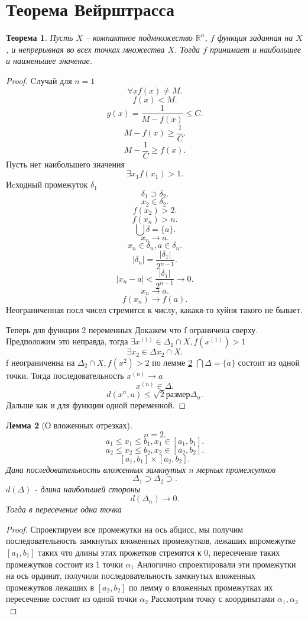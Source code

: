 \documentclass[14pt]{extarticle} \usepackage{fontspec}
\newtheorem{theorem}{Теорема}
\newtheorem{lemma}[theorem]{Лемма}
\begin{document}
\section{Теорема Вейрштрасса}
\begin{theorem}
    Пусть $X$ -- компактное подмножество $\mathbb{R}^{n}$, $f$ функция заданная на  $X$, и непрерывная во всех точках множества  $X$. Тогда $f$ принимает и наибольшее и наименьшее значение.
\end{theorem}
\begin{proof}
    Cлучай для $n  = 1$
    \[
    \forall  x f(x) \neq M
    .\] 
    \[
    f(x) < M
    .\] 
    \[
    g(x) = \frac{1}{M - f(x)} \le  C
    .\] 
    \[
    M - f(x) \ge  \frac{1}{C}
    .\] 
    \[
    M - \frac{1}{C} \ge  f(x)
    .\] 
    Пусть нет наибольшего значения
    \[
    \exists  x_1  f(x_1) > 1
    .\] 
    Иcходный промежуток  $\delta_1$
    \[
        \delta_1 \supset \delta_2
    .\]
    \[
    x_2 \in \delta_2
    .\] 
    \[
    f(x_2) > 2
    .\] 
    \[
    f(x_{n}) > n
    .\] 
    \[
        \bigcup  \delta = \{a\}
    .\]
    \[
    x_{n} \to a
    .\] 
    \[
    x_{n} \in \delta_{n}, a \in \delta_{n}
    .\] 
    \[
    |\delta_{n}| = \frac{|\delta_1|}{2^{n-1}}
    .\] 
    \[
    |x_{n} - a| < \frac{|\delta_{1}|}{2^{n - 1}} \to 0
    .\] 
    \[
    x_{n} \to a
    .\] 
    \[
    f(x_{n}) \to f(a)
    .\] 
    Неограниченная посл чисел стремится к числу, какакя-то хуйня такого не бывает.
    
    Теперь для функции $2$ переменных
    Докажем что  f ограничена сверху. Предположим это неправда, тогда $\exists x^{(1)} \in \Delta_{1} \cap X,  f(x^{(1)}) >  1$
    \[
   \exists x_2 \in  \Delta x_2 \cap X
    .\] 
    f неограниченна на $\Delta_2 \cap X, f(x^{2}) > 2$
    по лемме \ref{1} $\bigcap \Delta = \{a\}$ состоит из одной точки.
    Тогда последовательность $x^{(n)} \to a$
    \[
    x^{(n)} \in \Delta
    .\] 
    \[
        d(x^{n},a) \le \sqrt{2} \text{размер} \Delta_{n}
    .\] 
    Дальше как и для функции одной переменной.
\end{proof}
\begin{lemma}[О вложенных отрезках] \label{1}
    \[
    n  = 2
    .\] 
    \[
        a_1 \le  x_1 \le  b_1 , x_1 \in [a_1,b_1]
    .\] 
    \[
        a_2 \le  x_2 \le  b_2 , x_2 \in [a_2,b_2]
    .\] 
    \[
        [a_1,b_1] \times [a_2,b_2]
    .\]  
    Дана последовательность вложенных замкнутых $n$ мерных промежутков
    \[
    \varDelta_{1}  \supset \varDelta_2 \supset 
    .\] 
    $d(\varDelta)$ -  длина наибольшей стороны
     \[
    d(\varDelta_{n}) \to 0
    .\] 
    Тогда в пересечение одна точка
\end{lemma}
\begin{proof}
    Спроектируем все промежутки на ось абцисс, мы получим последовательность замкнутых вложенных промежутков, лежаших впромежутке $[a_1,b_1]$ таких что длины этих прожетков стремятся к 0, пересечение таких промежутков состоит из 1 точки $\alpha_1$
    Анлогично спроектировали эти промежутки на ось ординат, получили последовательность замкнутых вложенных промежутков лежаших в $[a_2,b_2]$ по лемму о вложенных промежутках их пересечение  состоит из одной точки $\alpha_2$
    Рассмотрим точку с координатами $\alpha_1,\alpha_2$
\end{proof}
\end{document}
